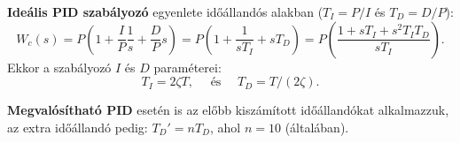 \textbf{Ideális PID szabályozó} egyenlete időállandós alakban
($T_I = P / I$ és $T_D = D / P$):
\begin{equation}
  W_c(s)
  = P \left( 1 + \frac{I}{P}\frac{1}{s} + \frac{D}{P}s \right)
  = P \left( 1 + \frac{1}{sT_I} + sT_D \right)
  = P \left( \frac{1 + sT_I + s^2 T_I T_D}{sT_I} \right)
  .
  \label{eq:PID-T}
\end{equation}
Ekkor a szabályozó $I$ és $D$ paraméterei:
\begin{equation}
  T_I  = 2 \zeta T
  , \quad \text{ és } \quad
  T_D = T / (2\zeta).
  \label{eq:PID-ID}
\end{equation}

\textbf{Megvalósítható PID} esetén is az előbb kiszámított időállandókat
alkalmazzuk, az extra időállandó pedig: $T_D' = nT_D$, ahol $n = 10$
(általában).
